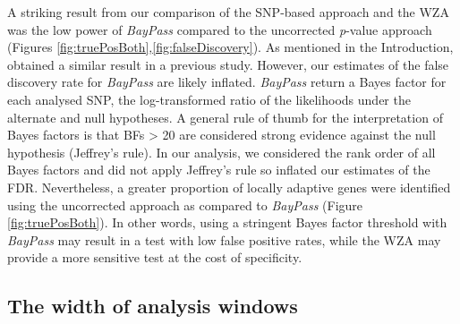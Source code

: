 \documentclass[10pt,twoside,lineno]{GSA_format}
\begin{document}
A striking result from our comparison of the SNP-based approach and the WZA was the low power of \textit{BayPass} compared to the uncorrected \textit{p}-value approach (Figures \ref{fig:truePosBoth},\ref{fig:falseDiscovery}). As mentioned in the Introduction, \cite{Lotterhos2019} obtained a similar result in a previous study. However, our estimates of the false discovery rate for \textit{BayPass} are likely inflated. \textit{BayPass} return a Bayes factor for each analysed SNP, the log-transformed ratio of the likelihoods under the alternate and null hypotheses. A general rule of thumb for the interpretation of Bayes factors is that BFs > 20 are considered strong evidence against the null hypothesis (Jeffrey's rule). In our analysis, we considered the rank order of all Bayes factors and did not apply Jeffrey's rule so inflated our estimates of the FDR. Nevertheless, a greater proportion of locally adaptive genes were identified using the uncorrected approach as compared to \textit{BayPass} (Figure \ref{fig:truePosBoth}). In other words, using a stringent Bayes factor threshold with \textit{BayPass} may result in a test with low false positive rates, while the WZA may provide a more sensitive test at the cost of specificity.  \\




\subsection{The width of analysis windows}
\end{document}
